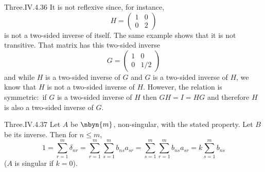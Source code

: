 \begin{ans}{Three.IV.4.36}
     It is not reflexive since, for instance,
     \begin{equation*}
       H=\begin{pmatrix}
         1  &0  \\
         0  &2
       \end{pmatrix}
     \end{equation*}
     is not a two-sided inverse of itself.
     The same example shows that it is not transitive.
     That matrix has this two-sided inverse
     \begin{equation*}
       G=\begin{pmatrix}
         1  &0  \\
         0  &1/2
       \end{pmatrix}
     \end{equation*}
     and while \( H \) is a two-sided inverse of \( G \) and \( G \)
     is a two-sided inverse of \( H \), we know that \( H \) is not a two-sided
     inverse of \( H \).
     However, the relation is symmetric:~if \( G \) is a two-sided inverse of
     \( H \) then
     \( GH=I=HG \) and therefore \( H \) is also a two-sided
     inverse of \( G \).
   
\end{ans}
\begin{ans}{Three.IV.4.37}
      \answerasgiven %
      Let \( A \) be \( \nbyn{m} \), non-singular, with the stated property.
      Let \( B \) be its inverse.
      Then for \( n\leq m \),
      \begin{equation*}
        1
        =\sum_{r=1}^{m}\delta_{nr}
        =\sum_{r=1}^{m}\sum_{s=1}^{m}b_{ns}a_{sr}
        =\sum_{s=1}^{m}\sum_{r=1}^{m}b_{ns}a_{sr}
        =k\sum_{s=1}^{m}b_{ns}
      \end{equation*}
      (\( A \) is singular if \( k=0 \)).
   
\end{ans}
